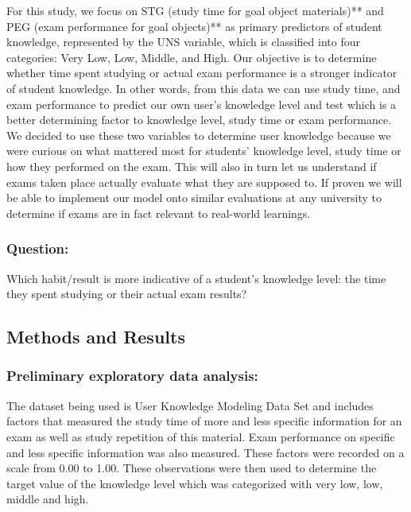 \documentclass[
  letterpaper,
  DIV=11,
  numbers=noendperiod]{scrartcl}
\begin{document}
For this study, we focus on STG (study time for goal object materials)**
and PEG (exam performance for goal objects)** as primary predictors of
student knowledge, represented by the UNS variable, which is classified
into four categories: Very Low, Low, Middle, and High. Our objective is
to determine whether time spent studying or actual exam performance is a
stronger indicator of student knowledge. In other words, from this data
we can use study time, and exam performance to predict our own user's
knowledge level and test which is a better determining factor to
knowledge level, study time or exam performance. We decided to use these
two variables to determine user knowledge because we were curious on
what mattered most for students' knowledge level, study time or how they
performed on the exam. This will also in turn let us understand if exams
taken place actually evaluate what they are supposed to. If proven we
will be able to implement our model onto similar evaluations at any
university to determine if exams are in fact relevant to real-world
learnings.

\subsubsection{Question:}\label{question}

Which habit/result is more indicative of a student's knowledge level:
the time they spent studying or their actual exam results?

\subsection{\texorpdfstring{\textbf{Methods and
Results}}{Methods and Results}}\label{methods-and-results}

\subsubsection{Preliminary exploratory data
analysis:}\label{preliminary-exploratory-data-analysis}

The dataset being used is User Knowledge Modeling Data Set and includes
factors that measured the study time of more and less specific
information for an exam as well as study repetition of this material.
Exam performance on specific and less specific information was also
measured. These factors were recorded on a scale from 0.00 to 1.00.
These observations were then used to determine the target value of the
knowledge level which was categorized with very low, low, middle and
high.
\end{document}

